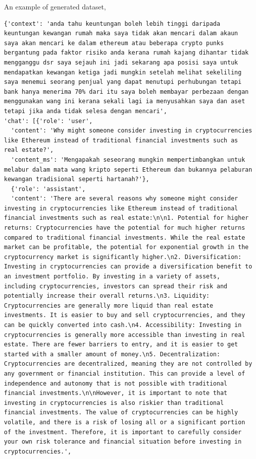 \documentclass[preprint]{article}
\begin{document}
An example of generated dataset,

\begin{lstlisting}[breaklines=true]
{'context': 'anda tahu keuntungan boleh lebih tinggi daripada keuntungan kewangan rumah maka saya tidak akan mencari dalam akaun saya akan mencari ke dalam ethereum atau beberapa crypto punks bergantung pada faktor risiko anda kerana rumah kajang dihantar tidak mengganggu dsr saya sejauh ini jadi sekarang apa posisi saya untuk mendapatkan kewangan ketiga jadi mungkin setelah melihat sekeliling saya menemui seorang penjual yang dapat menutupi perhubungan tetapi bank hanya menerima 70% dari itu saya boleh membayar perbezaan dengan menggunakan wang ini kerana sekali lagi ia menyusahkan saya dan aset tetapi jika anda tidak selesa dengan mencari',
'chat': [{'role': 'user',
  'content': 'Why might someone consider investing in cryptocurrencies like Ethereum instead of traditional financial investments such as real estate?',
  'content_ms': 'Mengapakah seseorang mungkin mempertimbangkan untuk melabur dalam mata wang kripto seperti Ethereum dan bukannya pelaburan kewangan tradisional seperti hartanah?'},
  {'role': 'assistant',
  'content': 'There are several reasons why someone might consider investing in cryptocurrencies like Ethereum instead of traditional financial investments such as real estate:\n\n1. Potential for higher returns: Cryptocurrencies have the potential for much higher returns compared to traditional financial investments. While the real estate market can be profitable, the potential for exponential growth in the cryptocurrency market is significantly higher.\n2. Diversification: Investing in cryptocurrencies can provide a diversification benefit to an investment portfolio. By investing in a variety of assets, including cryptocurrencies, investors can spread their risk and potentially increase their overall returns.\n3. Liquidity: Cryptocurrencies are generally more liquid than real estate investments. It is easier to buy and sell cryptocurrencies, and they can be quickly converted into cash.\n4. Accessibility: Investing in cryptocurrencies is generally more accessible than investing in real estate. There are fewer barriers to entry, and it is easier to get started with a smaller amount of money.\n5. Decentralization: Cryptocurrencies are decentralized, meaning they are not controlled by any government or financial institution. This can provide a level of independence and autonomy that is not possible with traditional financial investments.\n\nHowever, it is important to note that investing in cryptocurrencies is also riskier than traditional financial investments. The value of cryptocurrencies can be highly volatile, and there is a risk of losing all or a significant portion of the investment. Therefore, it is important to carefully consider your own risk tolerance and financial situation before investing in cryptocurrencies.',

\end{lstlisting}
\end{document}
